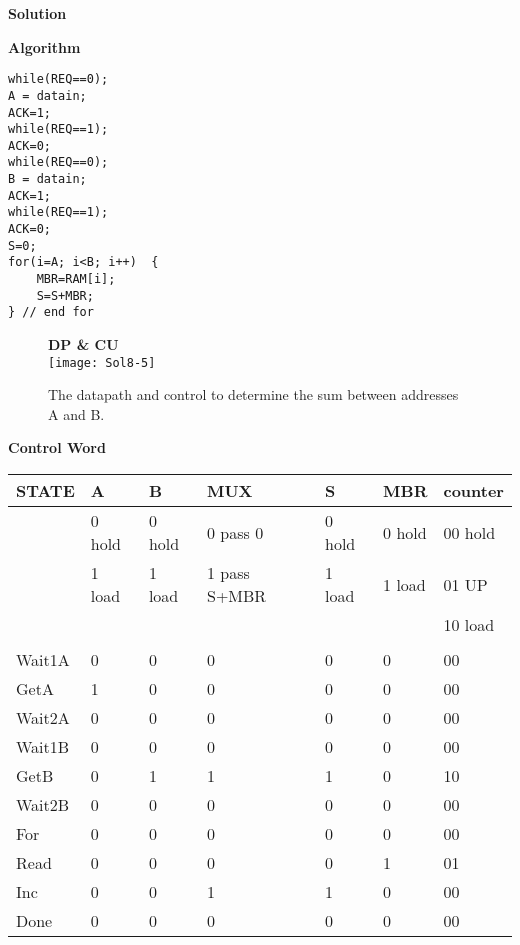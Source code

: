 \begin{enumerate}
        \begin{onlysolution}[fragile]  \textbf{Solution}

            \textbf{ Algorithm}
              \begin{verbatim}
while(REQ==0);
A = datain;
ACK=1;
while(REQ==1);
ACK=0;
while(REQ==0);
B = datain;
ACK=1;
while(REQ==1);
ACK=0;
S=0;
for(i=A; i<B; i++)  {
    MBR=RAM[i];
    S=S+MBR;
} // end for
\end{verbatim}

            \begin{figure}[H]
                \textbf{ DP \& CU} \\ %
                \texttt{[image: Sol8-5]}
                \caption{The datapath and control to determine the sum between
                addresses A and B.}
            \end{figure}

            \textbf{Control Word}

            \begin{tabular}{l|l|l|l|l|l|l}
                STATE  & A      & B      & MUX          & S      & MBR    & counter \\ \hline
                & 0 hold & 0 hold & 0 pass 0     & 0 hold & 0 hold & 00 hold \\ \hline
                & 1 load & 1 load & 1 pass S+MBR & 1 load & 1 load & 01 UP   \\ \hline
                &        &        &              &        &        & 10 load \\ \hline
                &        &        &              &        &        &         \\ \hline
                Wait1A & 0      & 0      & 0            & 0      & 0      & 00      \\ \hline
                GetA   & 1      & 0      & 0            & 0      & 0      & 00      \\ \hline
                Wait2A & 0      & 0      & 0            & 0      & 0      & 00      \\ \hline
                Wait1B & 0      & 0      & 0            & 0      & 0      & 00      \\ \hline
                GetB   & 0      & 1      & 1            & 1      & 0      & 10      \\ \hline
                Wait2B & 0      & 0      & 0            & 0      & 0      & 00      \\ \hline
                For    & 0      & 0      & 0            & 0      & 0      & 00      \\ \hline
                Read   & 0      & 0      & 0            & 0      & 1      & 01      \\ \hline
                Inc    & 0      & 0      & 1            & 1      & 0      & 00      \\ \hline
                Done   & 0      & 0      & 0            & 0      & 0      & 00      \\
            \end{tabular}


\end{onlysolution}
\end{enumerate}
